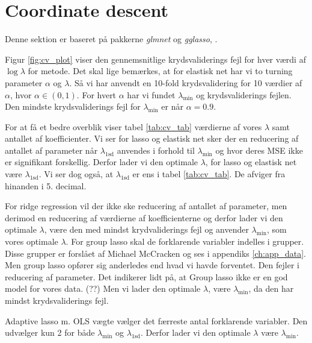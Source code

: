 \section{Coordinate descent}
Denne sektion er baseret på pakkerne \textit{glmnet} og \textit{gglasso}, \citep{gglasso}.

Figur \ref{fig:cv_plot} viser den gennemsnitlige krydsvaliderings fejl for hver værdi af $\log \lambda$ for metode.
Det skal lige bemærkes, at for elastisk net har vi to turning parameter $\alpha$ og $\lambda$. 
Så vi har anvendt en 10-fold krydsvalidering for 10 værdier af $\alpha$, hvor $\alpha \in (0,1)$. 
For hvert $\alpha$ har vi fundet $\lambda_{\min}$ og krydsvaliderings fejlen.  
Den mindste krydsvaliderings fejl for $\lambda_{\min}$ er når $\alpha =0.9$. 




For at få et bedre overblik viser tabel  \ref{tab:cv_tab} værdierne af vores $\lambda$ samt antallet af koefficienter. 
Vi ser for lasso og elastisk net sker der en reducering af antallet af parameter når $\lambda_{1\text{sd}}$ anvendes i forhold til $\lambda_{\min}$ og hvor deres MSE ikke er signifikant forskellig.  
Derfor lader vi den optimale $\lambda$, for lasso og elastisk net være $\lambda_{1\text{sd}}$.
Vi ser dog også, at $\lambda_{1\text{sd}}$ er ens i tabel \ref{tab:cv_tab}. 
De afviger fra hinanden i 5. decimal.  

For ridge regression vil der ikke ske reducering af antallet af parameter, men derimod en reducering af værdierne af koefficienterne og derfor lader vi den optimale $\lambda$, være den med mindst krydvaliderings fejl og anvender $\lambda_{\min}$, som vores optimale $\lambda$. 
%
For group lasso skal de forklarende variabler indelles i  grupper. 
Disse grupper er forslået af Michael McCracken og ses i appendiks \ref{ch:app_data}.
Men group lasso opfører sig anderledes end hvad vi havde forventet. 
Den fejler i reducering af parameter. 
Det indikerer lidt på, at Group lasso ikke er en god model for vores data. (??)
Men vi lader den optimale $\lambda$, være $\lambda_{\min}$, da den har mindst krydsvaliderings fejl. 

Adaptive lasso m. OLS vægte vælger det færreste antal forklarende variabler. 
Den udvælger kun 2 for både  $\lambda_{\min}$ og $\lambda_{1\text{sd}}$. 
Derfor lader vi den optimale $\lambda$ være $\lambda_{\min}$. 


